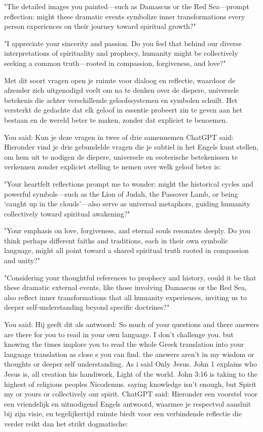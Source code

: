 "The detailed images you painted—such as Damascus or the Red Sea—prompt reflection: might these dramatic events symbolize inner transformations every person experiences on their journey toward spiritual growth?"

"I appreciate your sincerity and passion. Do you feel that behind our diverse interpretations of spirituality and prophecy, humanity might be collectively seeking a common truth—rooted in compassion, forgiveness, and love?"

Met dit soort vragen open je ruimte voor dialoog en reflectie, waardoor de afzender zich uitgenodigd voelt om na te denken over de diepere, universele betekenis die achter verschillende geloofssystemen en symbolen schuilt. Het versterkt de gedachte dat elk geloof in essentie probeert zin te geven aan het bestaan en de wereld beter te maken, zonder dat expliciet te benoemen.

You said:
Kun je deze vragen in twee of drie samennemen
ChatGPT said:
Hieronder vind je drie gebundelde vragen die je subtiel in het Engels kunt stellen, om hem uit te nodigen de diepere, universele en esoterische betekenissen te verkennen zonder expliciet stelling te nemen over welk geloof beter is:

"Your heartfelt reflections prompt me to wonder: might the historical cycles and powerful symbols—such as the Lion of Judah, the Passover Lamb, or being ‘caught up in the clouds’—also serve as universal metaphors, guiding humanity collectively toward spiritual awakening?"

"Your emphasis on love, forgiveness, and eternal souls resonates deeply. Do you think perhaps different faiths and traditions, each in their own symbolic language, might all point toward a shared spiritual truth rooted in compassion and unity?"

"Considering your thoughtful references to prophecy and history, could it be that these dramatic external events, like those involving Damascus or the Red Sea, also reflect inner transformations that all humanity experiences, inviting us to deeper self-understanding beyond specific doctrines?"

You said:
Hij geeft dit als antwoord: So much of your questions and there answers are there for you to read in your own language. I don't challenge you.  but knowing the times implore you to read the whole Greek translation into your language translation as close s you can find.  the answers aren't in my wisdom or thoughts or deeper self understanding.  As i said Only Jesus. John 1 explains who Jesus is, all creation his handiwork,  Light of the world.  John 3:16 is taking to the highest of religious peoples Nicodemus. saying knowledge isn't enough,  but Spirit my or yours or collectively our spirit.
ChatGPT said:
Hieronder een voorstel voor een vriendelijk en uitnodigend Engels antwoord, waarmee je respectvol aansluit bij zijn visie, en tegelijkertijd ruimte biedt voor een verbindende reflectie die verder reikt dan het strikt dogmatische:

